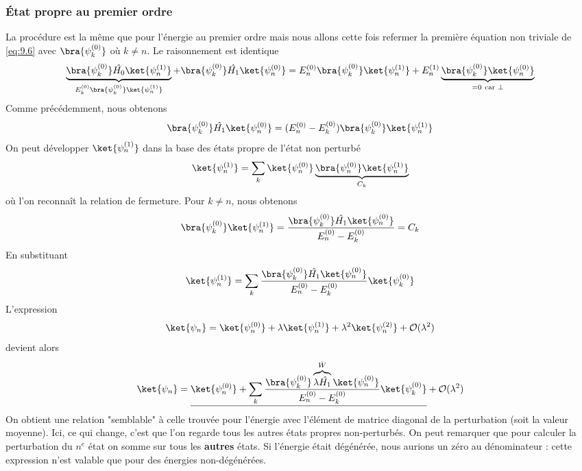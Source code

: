 		\subsubsection{État propre au premier ordre}
		La procédure est la même que pour l'énergie au premier ordre mais nous allons cette 
		fois refermer la première équation non triviale de \eqref{eq:9.6} avec 
		$\bra{\psi_k^{(0)}}$ où $k\neq n$. Le raisonnement est identique
		\begin{equation}				
		\underbrace{\bra{\psi_k^{(0)}}\hat{H_0}\ket{\psi_n^{(1)}}}_{E_k^{(0)}
		\bra{\psi_k^{(0)}}\ket{\psi_n^{(1)}}}+\bra{\psi_k^{(0)}}\hat{H_1}\ket{\psi_n^{(0)}} =
		E_n^{(0)}\bra{\psi_k^{(0)}}\ket{\psi_n^{(1)}}+E_n^{(1)}
		\underbrace{\bra{\psi_k^{(0)}}\ket{\psi_n^{(0)}}}_{=0\ \text{car }\perp}
		\end{equation}
		Comme précédemment, nous obtenons
		\begin{equation}
		\bra{\psi_k^{(0)}}\hat{H_1}\ket{\psi_n^{(0)}} = (E_n^{(0)}-E_k^{(0)})
		\bra{\psi_k^{(0)}}\ket{\psi_n^{(1)}}
		\end{equation}
		On peut développer $\ket{\psi_n^{(1)}}$ dans la base des états propre de
		l'état non perturbé
		\begin{equation}
		\ket{\psi_n^{(1)}} = \sum_k \ket{\psi_n^{(0)}}\underbrace{\bra{\psi_n^{(0)}}\ket{\psi_n^{(1)}}}_{
		C_k}	
		\end{equation}
		où l'on reconnaît la relation de fermeture. Pour $k\neq n$, nous obtenons
		\begin{equation}
		\bra{\psi_k^{(0)}}\ket{\psi_n^{(1)}} = \dfrac{\bra{\psi_k^{(0)}}\hat{H_1}\ket{\psi_n^{(0)}}}{
		E_n^{(0)}-E_k^{(0)}} = C_k
		\end{equation}
		En substituant
		\begin{equation}
		\ket{\psi_n^{(1)}} = \sum_k \dfrac{\bra{\psi_k^{(0)}}\hat{H_1}\ket{\psi_n^{(0)}}}{
		E_n^{(0)}-E_k^{(0)}} \ket{\psi_k^{(0)}}
		\end{equation}
		L'expression
		\begin{equation}
		\ket{\psi_n} = 	\ket{\psi_n^{(0)}}+\lambda\ket{\psi_n^{(1)}}+\lambda^2\ket{
		\psi_n^{(2)}}+\mathcal{O}(\lambda^2)
		\end{equation}
		devient alors
		\begin{equation}
		\ket{\psi_n} = \underline{\ket{\psi_n^{(0)}} + \sum_k	\dfrac{\bra{\psi_k^{(0)}}\overbrace{
		\lambda\hat{H_1}}^{	\hat{W}}\ket{\psi_n^{(0)}}}{E_n^{(0)}-E_k^{(0)}} \ket{\psi_k^{(0)}}} + 
		\mathcal{O}(\lambda^2)
		\end{equation}	
		On obtient une relation "semblable" à celle trouvée pour l'énergie avec l'élément 
		de matrice 	diagonal de la perturbation (soit la valeur moyenne). Ici, ce qui change, 
		c'est que l'on regarde tous les autres états propres non-perturbés. On peut remarquer 
		que pour calculer la perturbation du $n^e$ état on somme sur tous les \textbf{autres} états. 
		Si l'énergie était dégénérée, nous aurions un zéro au dénominateur : cette expression n'est 
		valable que pour des énergies non-dégénérées.
		
